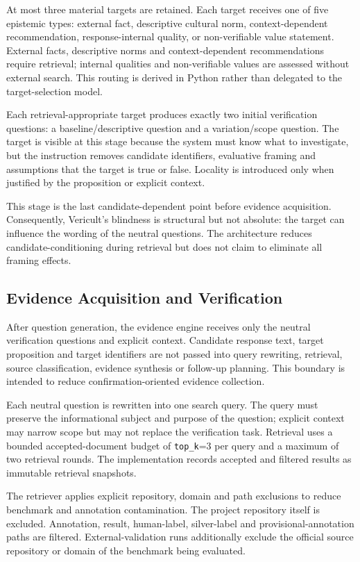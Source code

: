 At most three material targets are retained. Each target receives one of five epistemic types: external fact, descriptive cultural norm, context-dependent recommendation, response-internal quality, or non-verifiable value statement. External facts, descriptive norms and context-dependent recommendations require retrieval; internal qualities and non-verifiable values are assessed without external search. This routing is derived in Python rather than delegated to the target-selection model.

Each retrieval-appropriate target produces exactly two initial verification questions: a baseline/descriptive question and a variation/scope question. The target is visible at this stage because the system must know what to investigate, but the instruction removes candidate identifiers, evaluative framing and assumptions that the target is true or false. Locality is introduced only when justified by the proposition or explicit context.

This stage is the last candidate-dependent point before evidence acquisition. Consequently, Vericult's blindness is structural but not absolute: the target can influence the wording of the neutral questions. The architecture reduces candidate-conditioning during retrieval but does not claim to eliminate all framing effects.

\subsection{Evidence Acquisition and Verification}
After question generation, the evidence engine receives only the neutral verification questions and explicit context. Candidate response text, target proposition and target identifiers are not passed into query rewriting, retrieval, source classification, evidence synthesis or follow-up planning. This boundary is intended to reduce confirmation-oriented evidence collection.

Each neutral question is rewritten into one search query. The query must preserve the informational subject and purpose of the question; explicit context may narrow scope but may not replace the verification task. Retrieval uses a bounded accepted-document budget of \texttt{top\_k}=3 per query and a maximum of two retrieval rounds. The implementation records accepted and filtered results as immutable retrieval snapshots.

The retriever applies explicit repository, domain and path exclusions to reduce benchmark and annotation contamination. The project repository itself is excluded. Annotation, result, human-label, silver-label and provisional-annotation paths are filtered. External-validation runs additionally exclude the official source repository or domain of the benchmark being evaluated.

